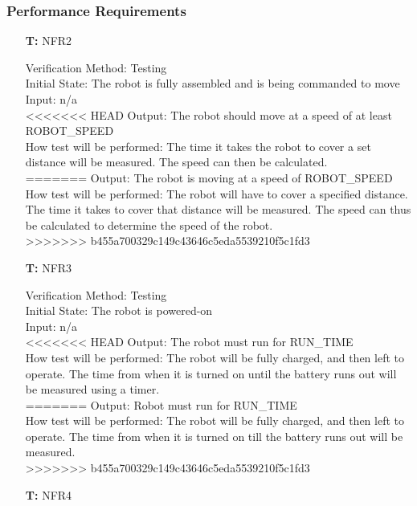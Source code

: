 \documentclass[12pt, titlepage]{article}
\newcounter{tnum} %
\begin{document}
\subsubsection{Performance Requirements}  
\begin{itemize}
  
\item[\textbf{T\refstepcounter{tnum}\thetnum:}]{NFR2\\}

Verification Method: Testing	\\				
Initial State: The robot is fully assembled and is being commanded to move	\\			
Input: n/a\\
<<<<<<< HEAD
Output: The robot should move at a speed of at least ROBOT\_SPEED \\
How test will be performed: The time it takes the robot to cover a set distance will be measured. The speed can then be calculated. \\
=======
Output: The robot is moving at a speed of ROBOT\_SPEED \\
How test will be performed: The robot will have to cover a specified distance. The time it takes to cover that distance will be measured. The speed can thus be calculated to determine the speed of the robot. \\
>>>>>>> b455a700329c149c43646c5eda5539210f5c1fd3
  
\item[\textbf{T\refstepcounter{tnum}\thetnum:}]{NFR3\\}

Verification Method: Testing	\\				
Initial State: The robot is powered-on	\\			
Input: n/a\\
<<<<<<< HEAD
Output: The robot must run for RUN\_TIME \\
How test will be performed: The robot will be fully charged, and then left to operate. The time from when it is turned on until the battery runs out will be measured using a timer. \\
=======
Output: Robot must run for RUN\_TIME \\
How test will be performed: The robot will be fully charged, and then left to operate. The time from when it is turned on till the battery runs out will be measured. \\
>>>>>>> b455a700329c149c43646c5eda5539210f5c1fd3
			

\item[\textbf{T\refstepcounter{tnum}\thetnum:}]{NFR4\\}


\end{itemize}
\end{document}

